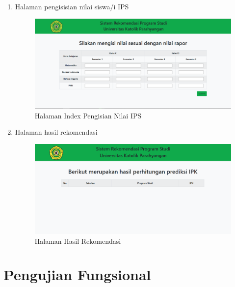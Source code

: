 \begin{enumerate}
    \item Halaman pengisisian nilai siswa/i IPS
    
    \begin{figure}[H]
        \centering
        \includegraphics[width = 12cm, height =8 cm]{Gambar/gambar53.png}
        \caption{Halaman Index Pengisian Nilai IPS}
        \label{fig:gambar53}
    \end{figure}
    
    \item Halaman hasil rekomendasi
    \begin{figure}[H]
        \centering
        \includegraphics[width = 12cm, height =8 cm]{Gambar/gambar54.png}
        \caption{Halaman Hasil Rekomendasi}
        \label{fig:gambar54}
    \end{figure}
\end{enumerate}

\section{Pengujian Fungsional}
\label{sec:pengujian fungsional}

